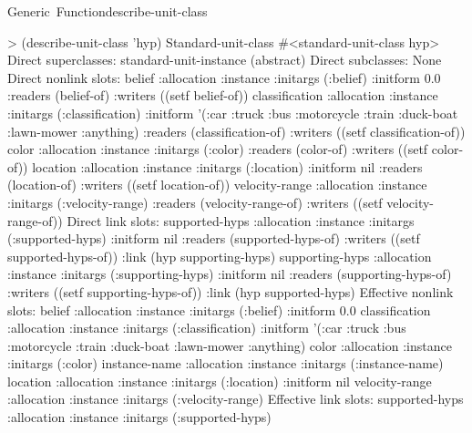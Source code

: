 \documentclass[10pt,twoside,english,pdftex]{article}
\begin{document}
\begin{functiondoc}{Generic~Function}{describe-unit-class}
\fnexample
%
\W\supp
\begin{example}
  > (describe-unit-class 'hyp)
  Standard-unit-class #<standard-unit-class hyp>
    Direct superclasses:
      standard-unit-instance (abstract)
    Direct subclasses: None\goodpagebreak
    Direct nonlink slots:
      belief
        :allocation :instance
        :initargs (:belief)
        :initform 0.0
        :readers (belief-of)
        :writers ((setf belief-of))\goodpagebreak
      classification
        :allocation :instance
        :initargs (:classification)
        :initform '(:car :truck :bus :motorcycle :train :duck-boat :lawn-mower
                    :anything)
        :readers (classification-of)
       :writers ((setf classification-of))\goodpagebreak
      color
        :allocation :instance
        :initargs (:color)
        :readers (color-of)
        :writers ((setf color-of))\goodpagebreak
      location
        :allocation :instance
        :initargs (:location)
        :initform nil
        :readers (location-of)
        :writers ((setf location-of))\goodpagebreak
      velocity-range
        :allocation :instance
        :initargs (:velocity-range)
        :readers (velocity-range-of)
        :writers ((setf velocity-range-of))\goodpagebreak
    Direct link slots:
      supported-hyps
        :allocation :instance
        :initargs (:supported-hyps)
        :initform nil
        :readers (supported-hyps-of)
        :writers ((setf supported-hyps-of))
        :link (hyp supporting-hyps)\goodpagebreak
      supporting-hyps
        :allocation :instance
        :initargs (:supporting-hyps)
        :initform nil
        :readers (supporting-hyps-of)
        :writers ((setf supporting-hyps-of))
        :link (hyp supported-hyps)\goodpagebreak
    Effective nonlink slots:
      belief
        :allocation :instance
        :initargs (:belief)
        :initform 0.0\goodpagebreak
      classification
        :allocation :instance
        :initargs (:classification)
        :initform '(:car :truck :bus :motorcycle :train :duck-boat :lawn-mower
                    :anything)\goodpagebreak
      color
        :allocation :instance
        :initargs (:color)\goodpagebreak
      instance-name
        :allocation :instance
        :initargs (:instance-name)\goodpagebreak
      location
        :allocation :instance
        :initargs (:location)
        :initform nil\goodpagebreak
      velocity-range
        :allocation :instance
        :initargs (:velocity-range)\goodpagebreak
    Effective link slots:
      supported-hyps
        :allocation :instance
        :initargs (:supported-hyps)

\end{example}
\end{functiondoc}
\end{document}
